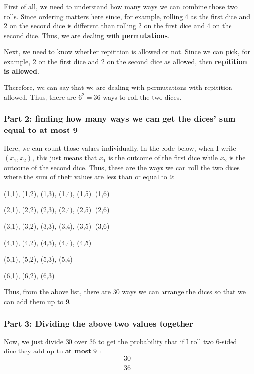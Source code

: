 \documentclass[11pt]{article}
\begin{document}
First of all, we need to understand how many ways we can combine those
two rolls. Since ordering matters here since, for example, rolling 4 as
the first dice and 2 on the second dice is different than rolling 2 on
the first dice and 4 on the second dice. Thus, we are dealing with
\textbf{permutations}.

Next, we need to know whether repitition is allowed or not. Since we can
pick, for example, 2 on the first dice and 2 on the second dice as
allowed, then \textbf{repitition is allowed}.

Therefore, we can say that we are dealing with permutations with
repitition allowed. Thus, there are \textbf{\(6^2 = 36\)} ways to roll
the two dices.

\subsubsection{\texorpdfstring{\textbf{Part 2: finding how many ways we
can get the dices' sum equal to at most
9}}{Part 2: finding how many ways we can get the dices' sum equal to at most 9}}\label{part-2-finding-how-many-ways-we-can-get-the-dices-sum-equal-to-at-most-9}

Here, we can count those values individually. In the code below, when I
write \((x_1,x_2)\), this just means that \(x_1\) is the outcome of the
first dice while \(x_2\) is the outcome of the second dice. Thus, these
are the ways we can roll the two dices where the sum of their values are
less than or equal to 9:

(1,1), (1,2), (1,3), (1,4), (1,5), (1,6)

(2,1), (2,2), (2,3), (2,4), (2,5), (2,6)

(3,1), (3,2), (3,3), (3,4), (3,5), (3,6)

(4,1), (4,2), (4,3), (4,4), (4,5)

(5,1), (5,2), (5,3), (5,4)

(6,1), (6,2), (6,3)

Thus, from the above list, there are \(30\) ways we can arrange the
dices so that we can add them up to \(9\).

\subsubsection{\texorpdfstring{\textbf{Part 3: Dividing the above two
values
together}}{Part 3: Dividing the above two values together}}\label{part-3-dividing-the-above-two-values-together}

Now, we just divide 30 over 36 to get the probability that if I roll two
6-sided dice they add up to \textbf{at most} \(9\) : \[\frac{30}{36}\]
\end{document}
